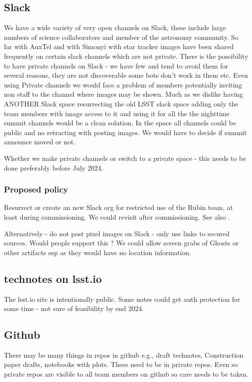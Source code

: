 \subsection{Slack}
We have a wide variety of very open channels on Slack, these include large numbers of science collaborators and member of the astronomy community.
So far with AuxTel and with Simonyi with star tracker images have been shared frequently on certain slack channels which are not private.
There is the possibility to have private channels on Slack - we have few and tend to avoid them for several reasons, they are not discoverable some bots don't work in them etc.
Even using Private channels we would face a problem of members potentially inviting non staff to the channel where images may be shown.
Much as we dislike having ANOTHER Slack space resurrecting the old LSST slack space adding only the team members with image access to it and using it for all the the nighttime summit channels would be a clean solution.
In the space all channels could be public and no retracting with posting images.
We would have to decide if summit announce moved or not.

Whether we make private channels or switch to a private space - this needs to be done preferably before July 2024.
\subsubsection{Proposed policy}
Resurrect or create an new Slack org for restricted use of the Rubin team, at least during commissioning.
We could revisit after commissioning.
See also .

Alternatively - do not post pixel images on Slack - only use links to secured sources.
Would people support this ? We could allow screen grabs of Ghosts or other artifacts esp as they would have no location information.

\subsection{technotes on lsst.io}
The lsst.io site is intentionally public.
Some notes could get auth protection for some time - not sure of feasibility by end 2024.


\subsection{Github }
There may be many things in repos in github e.g., draft technotes, Construction paper drafts, notebooks with plots.
These need to be in private repos.
Even so private repos are visible to all team members on github so care needs to be taken.
